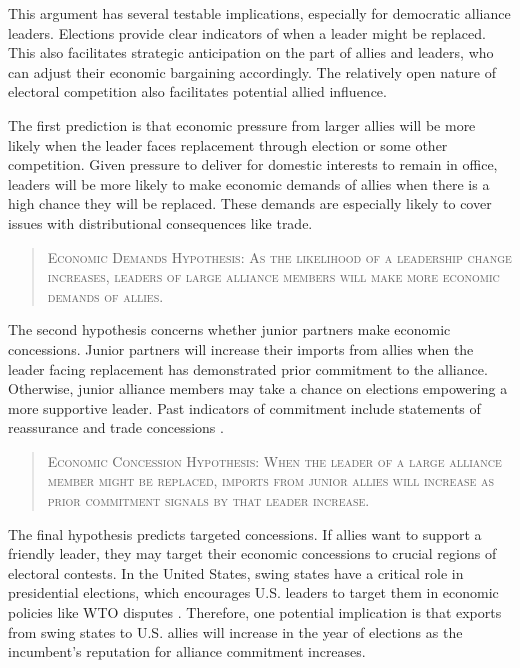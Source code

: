 \documentclass[12pt]{article}
\begin{document}
This argument has several testable implications, especially for democratic alliance leaders.
Elections provide clear indicators of when a leader might be replaced. 
This also facilitates strategic anticipation on the part of allies and leaders, who can adjust their economic bargaining accordingly. 
The relatively open nature of electoral competition also facilitates potential allied influence. 


The first prediction is that economic pressure from larger allies will be more likely when the leader faces replacement through election or some other competition. 
Given pressure to deliver for domestic interests to remain in office, leaders will be more likely to make economic demands of allies when there is a high chance they will be replaced. 
These demands are especially likely to cover issues with distributional consequences like trade.


\begin{quote}
\textsc{Economic Demands Hypothesis: As the likelihood of a leadership change increases, leaders of large alliance members will make more economic demands of allies.}
\end{quote}


The second hypothesis concerns whether junior partners make economic concessions. 
Junior partners will increase their imports from allies when the leader facing replacement has demonstrated prior commitment to the alliance. 
Otherwise, junior alliance members may take a chance on elections empowering a more supportive leader. 
Past indicators of commitment include statements of reassurance \citep{Blankenship2020} and trade concessions \citep{WolfordKim2017}.


\begin{quote}
\textsc{Economic Concession Hypothesis: When the leader of a large alliance member might be replaced, imports from junior allies will increase as prior commitment signals by that leader increase.}
\end{quote}



The final hypothesis predicts targeted concessions.
If allies want to support a friendly leader, they may target their economic concessions to crucial regions of electoral contests. 
In the United States, swing states have a critical role in presidential elections, which encourages U.S. leaders to target them in economic policies like WTO disputes \citep{Conconietal2017}.
Therefore, one potential implication is that exports from swing states to U.S. allies will increase in the year of elections as the incumbent's reputation for alliance commitment increases.
\end{document}
